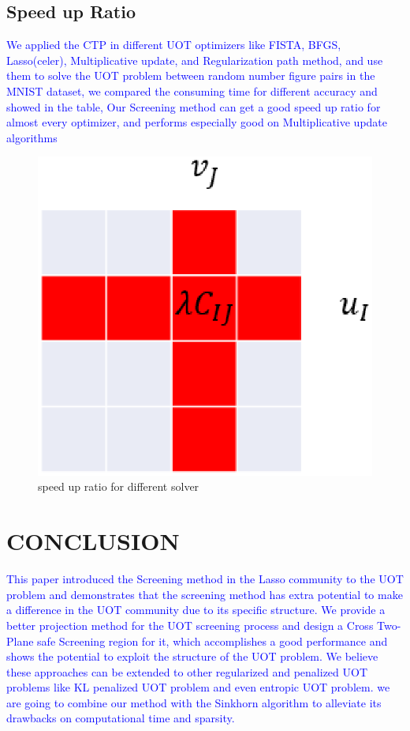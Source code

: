 \documentclass[twoside]{article}
\theoremstyle{plain}
\newcommand{\changeXS}[1]{\textcolor{blue}{#1}}
\begin{document}
\subsection{Speed up Ratio}

\changeXS{We applied the CTP in different UOT optimizers like FISTA, BFGS, Lasso(celer), Multiplicative update, and Regularization path method, and use them to solve the UOT problem between random number figure pairs in the MNIST dataset, we compared the consuming time for different accuracy and showed in the table, Our Screening method can get a good speed up ratio for almost every optimizer, and performs especially good on Multiplicative update algorithms}
	\begin{figure}[h]
	\begin{center}	
	\includegraphics[width = \linewidth]{pic/divide}
	\caption{speed up ratio for different solver}
	\end{center}	
	\end{figure}



\section{CONCLUSION}
\changeXS{This paper introduced the Screening method in the Lasso community to the UOT problem and demonstrates that the screening method has extra potential to make a difference in the UOT community due to its specific structure. We provide a better projection method for the UOT screening process and design a Cross Two-Plane safe Screening region for it, which accomplishes a good performance and shows the potential to exploit the structure of the UOT problem. We believe these approaches can be extended to other regularized and penalized UOT problems like KL penalized UOT \citep{Dantas_ICASSP_2021} problem and even entropic UOT problem. we are going to combine our method with the Sinkhorn algorithm to alleviate its drawbacks on computational time and sparsity.}
\end{document}
